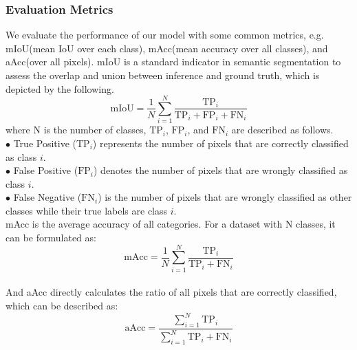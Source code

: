 \documentclass[lettersize,journal]{IEEEtran}
\begin{document}
\subsubsection*{Evaluation Metrics}

We evaluate the performance of our model with some common metrics, e.g. mIoU(mean IoU over each class), mAcc(mean accuracy over all classes), and aAcc(over all pixels). mIoU is a standard indicator in semantic segmentation to assess the overlap and union between inference and ground truth, which is depicted by the following.
\begin{equation}
    \text{mIoU} = \frac{1}{N} \sum_{i=1}^N \frac{\mathrm{TP}_i}{\mathrm{TP}_i + \mathrm{FP}_i + \mathrm{FN}_i}
\end{equation}
where N is the number of classes, $\mathrm{TP}_i$, $\mathrm{FP}_i$, and $\mathrm{FN}_i$ are described as follows.
\\$\bullet$ True Positive ($\mathrm{TP}_i$) represents the number of pixels that are correctly classified as class $i$.
\\$\bullet$ False Positive ($\mathrm{FP}_i$) denotes the number of pixels that are wrongly classified as class $i$.
\\$\bullet$ False Negative ($\mathrm{FN}_i$) is the number of pixels that are wrongly classified as other classes while their true labels are class $i$. 
\\ mAcc is the average accuracy of all categories. For a dataset with N classes, it can be formulated as:
\begin{equation}
    \text{mAcc}=\frac{1}{N}\sum_{i=1}^N\frac{\mathrm{TP}_i}{\mathrm{TP}_i + \mathrm{FN}_i}
\end{equation}
\\And aAcc directly calculates the ratio of all pixels that are correctly classified, which can be described as:
\begin{equation}
    \text{aAcc} =\frac{\sum_{i=1}^N\mathrm{TP}_i}{\sum_{i=1}^N\mathrm{TP}_i + \mathrm{FN}_i}
\end{equation}
\end{document}
